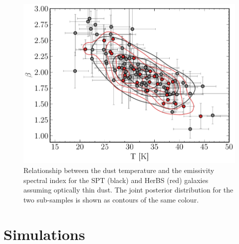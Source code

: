 \begin{figure}
	\centering
	\includegraphics[width=0.75\columnwidth]{Figures/beta_t_correlation.pdf}
	\caption[Relationship between $\beta$ and $T_\textrm{dust}$ for SPT and HerBS galaxies]{Relationship between the dust temperature and the emissivity spectral index for the SPT (black) and HerBS (red) galaxies assuming optically thin dust. The joint posterior distribution for the two sub-samples is shown as contours of the same colour.}
	\label{fig:beta_t_correlation}
\end{figure}

\section{Simulations}
\label{sec:simulations}

